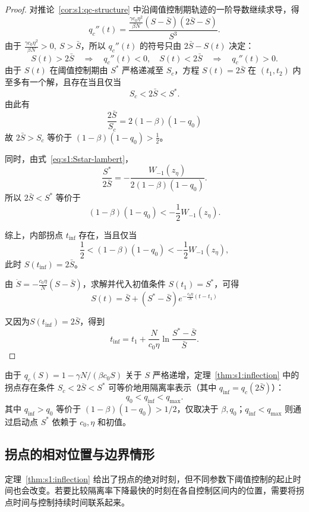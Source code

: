 \documentclass[UTF8,a4paper,10pt,fontset=fandol]{ctexart}
\theoremstyle{cnplain}
\theoremstyle{remark}
\newcommand{\qinf}{q_{\mathrm{inf}}}
\numberwithin{equation}{section}
\begin{document}
\begin{proof}
    对推论~\ref{cor:s1:qc-structure} 中沿阈值控制期轨迹的一阶导数继续求导，得
    \[
    q_c''(t)
    =
    \frac{\frac{\gamma c_0\eta^2}{\beta N}(S-\bar S)(2\bar S-S)}{S^3}.
    \]
    由于 \(\frac{\gamma c_0\eta^2}{\beta N}>0,\ S>\bar S\)，所以 $q_c''(t)$ 的符号只由 $2\bar S-S(t)$ 决定：
    \[
    S(t)>2\bar S
    \quad\Rightarrow\quad
    q_c''(t)<0,
    \quad S(t)<2\bar S
    \quad\Rightarrow\quad
    q_c''(t)>0.
    \]
    由于 $S(t)$ 在阈值控制期由 $S^*$ 严格递减至 $S_c$，方程 $S(t)=2\bar S$ 在 $(t_1,t_2)$ 内至多有一个解，且存在当且仅当
    \[
    S_c<2\bar S<S^*.
    \]
    由此有
    \[
    \frac{2\bar{S}}{S_c}=2(1-\beta)(1-q_0)
    \]
    故 $2\bar S>S_c$ 等价于 $(1-\beta)(1-q_0)>\frac{1}{2}$。
    
    同时，由式~\eqref{eq:s1:Sstar-lambert}，
    \[
    \frac{S^*}{2\bar S}
    =
    -\frac{W_{-1}(z_\eta)}
    {2(1-\beta)(1-q_0)}.
    \]
    所以 $2\bar S<S^*$ 等价于
    \[
    (1-\beta)(1-q_0)<-\frac{1}{2}W_{-1}(z_\eta).
    \]

    综上，内部拐点 $t_{\mathrm{inf}}$ 存在，当且仅当
    \[
    \frac{1}{2}
    <(1-\beta)(1-q_0)
    <-\frac{1}{2}W_{-1}(z_\eta),
    \]
    此时 $S(t_{\mathrm{inf}})=2\bar S$。
    
    由 $\dot{S}=-\frac{c_0\eta}{N}(S-\bar S)$，求解并代入初值条件 $S(t_1)=S^*$，可得
    \[
    S(t)=\bar S+(S^*-\bar S)
    e^{-\frac{c_0\eta}{N}(t-t_1)}
    \]

    又因为\(S(t_{\mathrm{inf}})=2\bar S\)，得到
    \[
    t_{\mathrm{inf}}
    =
    t_1+
    \frac{N}{c_0\eta}
    \ln\frac{S^*-\bar S}{\bar S}.
    \]
\end{proof}
由于 $q_c(S)=1-\gamma N/(\beta c_0 S)$ 关于 $S$ 严格递增，定理~\ref{thm:s1:inflection} 中的拐点存在条件 $S_c<2\bar S<S^*$ 可等价地用隔离率表示（其中 $\qinf=q_c(2\bar S)$）：
\begin{equation}
q_0<\qinf<q_{\max}.
\label{eq:s1:inflection-exist}
\end{equation}
其中 $\qinf>q_0$ 等价于 $(1-\beta)(1-q_0)>1/2$，仅取决于 $\beta,q_0$；$\qinf<q_{\max}$ 则通过启动点 $S^*$ 依赖于 $c_0,\eta$ 和初值。


\subsection{拐点的相对位置与边界情形}
\label{sec:s1:inflection-position}
定理~\ref{thm:s1:inflection} 给出了拐点的绝对时刻，但不同参数下阈值控制的起止时间也会改变。若要比较隔离率下降最快的时刻在各自控制区间内的位置，需要将拐点时间与控制持续时间联系起来。
\end{document}
